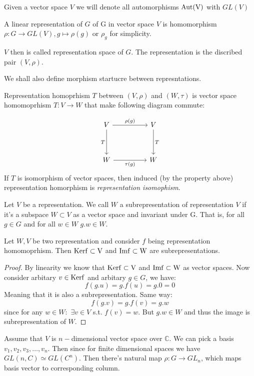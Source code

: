 \documentclass{amsart}
\def\aut{\rm Aut}
\def\ker{\rm Ker}
\def\im{\rm Im}
\begin{document}
\begin{definition}
    Given a vector space $V$ we will denote all automorphisms $\aut(V)$ with $GL(V)$
\end{definition}

\begin{definition}
    A linear representation of $G$ of G in vector space $V$ is homomorphism $\rho: G \to GL(V), g \mapsto \rho(g)$ or $\rho_g$ for simplicity.
\end{definition}

$V$ then is called representation space of $G$. The representation is the discribed pair $(V, \rho)$.

We shall also define morphism startucre between represntations.

\begin{definition}
 Representation homoprhism $T$ between $(V, \rho)$ and $(W, \tau)$ is vector space homomoprhism $T: V \to W$ that make following diagram commute:
\end{definition}


\[\begin{tikzcd}
	V && V \\
	\\
	W && W
	\arrow["{\rho(g)}", from=1-1, to=1-3]
	\arrow["T", from=1-3, to=3-3]
	\arrow["T"', from=1-1, to=3-1]
	\arrow["{\tau(g)}"', from=3-1, to=3-3]
\end{tikzcd}\]
If $T$ is isomorphism of vector spaces, then induced (by the property above) representation homorphism is \textit{representation isomophism}.


\begin{definition}
    Let $V$ be a representation. We call $W$ a subrepresentation of representation $V$ if it's a subspace $W \subset V$ as a vector space and invariant under G. That is, for all $g \in G$ and for all $w \in W$ $g.w \in W$.
\end{definition}

\begin{lemma}
    Let $W, V$ be two representation and consider $f$ being representation homomoprhism.
    Then $\ker f \subset V$ and 
    $\im f \subset W$ are subrepresentations.
\end{lemma}

\begin{proof}
    By linearity we know that $\ker f \subset V$ and $\im f \subset W$ as vector spaces. Now consider arbitary $v \in \ker f$ and arbitary $g \in G$, we have:
    $$ f(g.u) = g . f(u) = g . 0 = 0$$
    Meaning that it is also a subrepresentation. Same way:
    $$ f(g.v) = g. f(v) = g.w$$
    since for any $w \in W:$ $\exists v \in V$ s.t. $f(v)=w$. But $g.w \in W$ and thus the image is subrepresentation of $W$.
\end{proof}
Assume that $V$ is $n-$dimensional vector space over $\mathbb{C}$. We can pick a basis $v_1, v_2, v_3,\dots, v_n$. Then since for finite dimensional spaces we have $GL(n, C) \simeq GL(C^n)$. Then there's natural map $\rho: G\to GL_n$, which maps basis vector to corresponding column.
\end{document}
